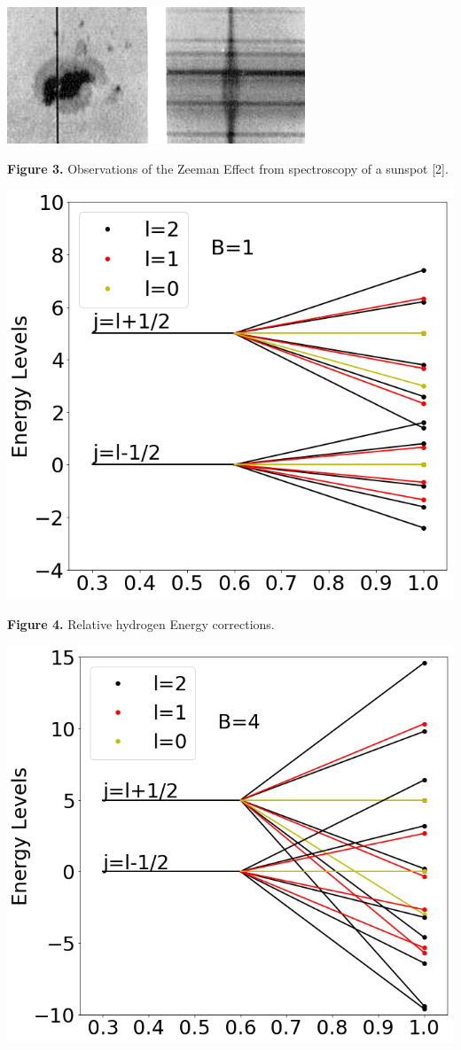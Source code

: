\documentclass[landscape,a0paper,fontscale=0.285]{baposter} %
\begin{document}
\begin{poster}
{{\begin{center}
	\includegraphics[width=0.75\linewidth]{figures/observed}
	
	{\footnotesize \textbf{Figure 3.} Observations of the Zeeman Effect from spectroscopy of a sunspot [2].}
	
	\includegraphics[width=0.75\linewidth]{figures/Bis1}
	
	{\footnotesize \textbf{Figure 4.} Relative hydrogen Energy corrections.}
	
	\includegraphics[width=0.75\linewidth]{figures/Bis4}
	

\end{center}}}
\end{poster}
\end{document}
